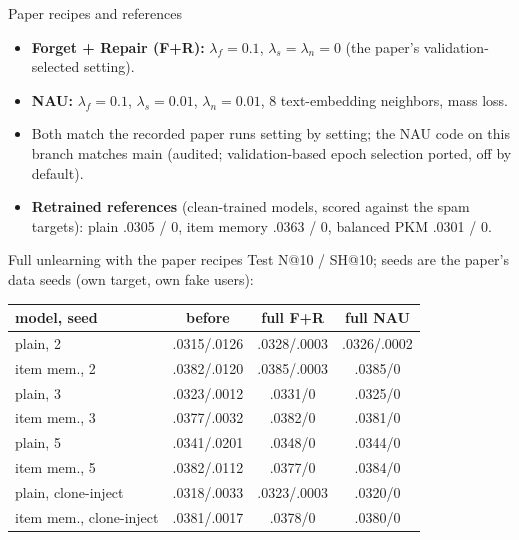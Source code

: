 \documentclass{beamer}
\begin{document}
\begin{frame}{Paper recipes and references}
\begin{itemize}
  \item \textbf{Forget + Repair (F+R):} $\lambda_f = 0.1$, $\lambda_s =
        \lambda_n = 0$ (the paper's validation-selected setting).
  \item \textbf{NAU:} $\lambda_f = 0.1$, $\lambda_s = 0.01$, $\lambda_n =
        0.01$, 8 text-embedding neighbors, mass loss.
  \item Both match the recorded paper runs setting by setting; the NAU code on
        this branch matches main (audited; validation-based epoch selection
        ported, off by default).
  \item \textbf{Retrained references} (clean-trained models, scored against the
        spam targets): plain .0305 / 0, item memory .0363 / 0, balanced PKM
        .0301 / 0.
\end{itemize}
\end{frame}

\begin{frame}{Full unlearning with the paper recipes}
Test N@10 / SH@10; seeds are the paper's data seeds (own target, own fake users):
\begin{center}
\footnotesize\setlength{\tabcolsep}{4pt}
\begin{tabular}{|l|c|c|c|}
\hline
model, seed & before & full F+R & full NAU \\
\hline
plain, 2       & .0315/.0126 & .0328/.0003 & .0326/.0002 \\
item mem., 2   & .0382/.0120 & .0385/.0003 & .0385/0 \\
plain, 3       & .0323/.0012 & .0331/0 & .0325/0 \\
item mem., 3   & .0377/.0032 & .0382/0 & .0381/0 \\
plain, 5       & .0341/.0201 & .0348/0 & .0344/0 \\
item mem., 5   & .0382/.0112 & .0377/0 & .0384/0 \\
\hline
plain, clone-inject     & .0318/.0033 & .0323/.0003 & .0320/0 \\
item mem., clone-inject & .0381/.0017 & .0378/0 & .0380/0 \\
\hline
\end{tabular}
\end{center}
\end{frame}
\end{document}
